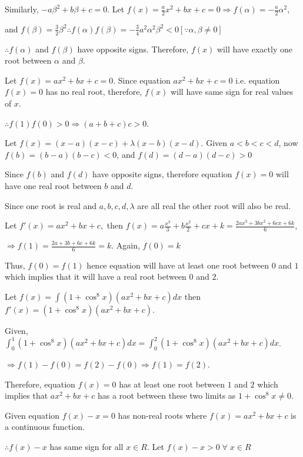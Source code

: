   Similarly, $-a\beta^2 + b\beta + c = 0$. Let $f(x) = \frac{a}{2}x^2 + bx + c = 0\Rightarrow f(\alpha) =
  -\frac{a}{2}\alpha^2$,

  and $f(\beta) = \frac{3}{2}\beta^2$$\therefore f(\alpha)f(\beta) = -\frac{3}{4}a^2\alpha^2\beta^2 < 0
  [\because \alpha,\beta \ne 0]$

  $\therefore f(\alpha)$ and $f(\beta)$ have opposite signs. Therefore, $f(x)$ will have exactly
  one root between $\alpha$ and $\beta$.
\item Let $f(x) = ax^2 + bx + c = 0$. Since equation $ax^2 + bx + c = 0$ i.e. equation $f(x) = 0$ has no
  real root, therefore, $f(x)$ will have same sign for real values of $x$.

  $\therefore f(1)f(0) > 0 \Rightarrow (a + b + c)c > 0$.
\item Let $f(x) = (x - a)(x - c) + \lambda (x - b)(x - d)$. Given $a < b < c < d$, now $f(b) = (b - a)(b -
  c) < 0$, and $f(d) = (d - a)(d - c) > 0$

  Since $f(b)$ and $f(d)$ have opposite signs, therefore equation $f(x) = 0$ will have one real
  root between $b$ and $d$.

  Since one root is real and $a, b, c, d, \lambda$ are all real the other root will also be real.
\item Let $f'(x) = ax^2 + bx + c,$ then $f(x) = a\frac{x^3}{3} + b\frac{x^2}{2} + cx + k = \frac{2ax^3 +
  3bx^2 + 6cx + 6k}{6}$,

  $\Rightarrow f(1) = \frac{2a + 3b + 6c + 6k}{6} = k$. Again, $f(0) = k$

  Thus, $f(0) = f(1)$ hence equation will have at least one root between $0$ and $1$ which implies
  that it will have a real root between $0$ and $2$.
\item Let $f(x) = \displaystyle\int (1 + \cos^8x)(ax^2 + bx + c)dx$ then $f'(x) = (1 + \cos^8x)(ax^2 + bx + c)$.

  Given, $\displaystyle\int_0^1 (1 + \cos^8 x)(ax^2 + bx + c)dx = \int_0^2 (1 + \cos^8 x)(ax^2 + bx + c)dx$.

  $\Rightarrow f(1) - f(0) = f(2) - f(0) \Rightarrow f(1) = f(2)$.

  Therefore, equation $f(x) = 0$ has at least one root between $1$ and $2$ which implies that
  $ax^2 + bx + c$ has a root between these two limits as $1 + \cos^8x \ne 0$.
\item Given equation $f(x) - x = 0$ has non-real roots where $f(x) = ax^2 + bx + c$ is a continuous function.

  $\therefore f(x) - x$  has same sign for all $x \in R$. Let $f(x) - x > 0\;\forall\;x \in R$

